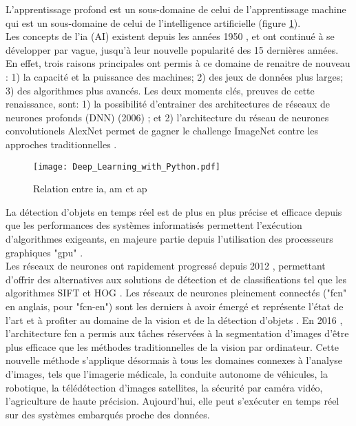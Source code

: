 ﻿\noindent L’apprentissage profond est un sous-domaine de celui de l'apprentissage machine qui est un sous-domaine de celui de l'intelligence artificielle (figure \ref{fig:ia_ml_ap}). 
\vspace{0.5\baselineskip}
\\
\noindent Les concepts de l'\lowercase{\acrlong{ia}} (AI) existent depuis les années 1950 \parencite{chollet_deep_2018, alom_history_2018}, et ont continué à se développer par vague, jusqu'à leur nouvelle popularité des 15 dernières années. En effet, trois raisons principales ont permis à ce domaine de renaitre de nouveau \parencite[p.~20]{chollet_deep_2018}: 1) la capacité et la puissance des machines; 2) des jeux de données plus larges; 3) des algorithmes plus avancés. Les deux moments clés, preuves de cette renaissance, sont: 1) la possibilité d'entrainer des architectures de réseaux de neurones profonds (DNN) (2006) \parencite[p.~6]{alom_history_2018}; et 2) l'architecture du réseau de neurones convolutionels AlexNet permet de gagner le challenge ImageNet contre les approches traditionnelles \parencite[p.~11]{alom_history_2018}. 
\begin{figure}[H]
   \centering
   \texttt{[image: Deep\_Learning\_with\_Python.pdf]}
   \caption[Relation entre \acrlong{ia}, \acrlong{am} et \acrlong{ap}]{Relation entre \acrlong{ia}, \acrlong{am} et \acrlong{ap} \parencite[p.~4]{chollet_deep_2018}}
   \label{fig:ia_ml_ap}
\end{figure}
\noindent La détection d'objets en temps réel est de plus en plus précise et efficace depuis que les performances des systèmes informatisés permettent l'exécution d'algorithmes exigeants, en majeure partie depuis l'utilisation des processeurs graphiques "\acrshort{gpu}" \parencite{chong_real-time_1992, dettmers_deep_2015, beam_deep_2017, jiaconda_concise_2019, zheng_real-time_2020, kurenkov_brief_2015}. 
\vspace{0.5\baselineskip}
\\
\noindent Les réseaux de neurones ont rapidement progressé depuis 2012 \parencite{beam_deep_2017}, permettant d'offrir des alternatives aux solutions de détection et de classifications tel que les algorithmes SIFT et HOG \parencite{pathak_architecturally_2019}. Les réseaux de neurones pleinement connectés ("\acrshort{fcn}" en anglais, pour "\acrlong{fcn-en}") sont les derniers à avoir émergé et représente l'état de l'art \parencite{zheng_real-time_2020} et à profiter au domaine de la vision et de la détection d'objets \parencite{nguyen_mavnet_2019, zheng_real-time_2020}. En 2016 \parencite[p.~14]{alom_history_2018}, l'architecture \acrshort{fcn} a permis aux tâches réservées à la segmentation d'images d'être plus efficace que les méthodes traditionnelles de la vision par ordinateur. Cette nouvelle méthode s'applique désormais à tous les domaines connexes à l'analyse d'images, tels que l'imagerie médicale, la conduite autonome de véhicules, la robotique, la télédétection d'images satellites, la sécurité par caméra vidéo, l'agriculture de haute précision. Aujourd'hui, elle peut s'exécuter en temps réel sur des systèmes embarqués proche des données. 

